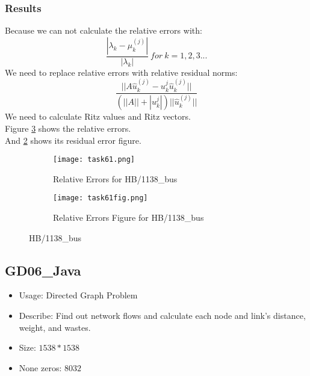 \documentclass{article}
\begin{document}
\subsubsection{Results}
\begin{flushleft}
Because we can not calculate the relative errors with:
\[\frac{|\lambda_k-\mu^{(j)}_k|}{|\lambda_k|}\ for\ k=1,2,3...\]
We need to replace relative errors with relative residual norms:
\[\frac{||A\hat{u}^{(j)}_k-u^{j}_k\hat{u}^{(j)}_k||}{(||A||+|u^{j}_k|)||\hat{u}^{(j)}_k||}\]
We need to calculate Ritz values and Ritz vectors.\\
Figure \ref{fig:task61} shows the relative errors.\\
And \ref{fig:task61fig} shows its residual error figure.
\end{flushleft}
\begin{figure}[H]
    \centering
    \begin{subfigure}{0.5\textwidth}
        \centering
        \texttt{[image: task61.png]}
        \caption{Relative Errors for HB/1138\_bus}
        \label{fig:task61}
    \end{subfigure}
    \begin{subfigure}{0.5\textwidth}
        \centering
        \texttt{[image: task61fig.png]}
        \caption{Relative Errors Figure for HB/1138\_bus}
        \label{fig:task61fig}
    \end{subfigure}
    \caption{HB/1138\_bus}
    \label{fig:task61}
\end{figure}
\subsection{GD06\_Java}
\begin{flushleft}
\begin{itemize}
    \item Usage: Directed Graph Problem
    \item Describe: Find out network flows and calculate each node and link's distance, weight, and wastes.
    \item Size: $1538*1538$
    \item None zeros: $8032$
\end{itemize}
\end{flushleft}
\end{document}
